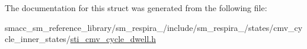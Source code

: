 The documentation for this struct was generated from the following file\+:\begin{DoxyCompactItemize}
\item 
smacc\+\_\+sm\+\_\+reference\+\_\+library/sm\+\_\+respira\+\_/include/sm\+\_\+respira\+\_/states/cmv\+\_\+cycle\+\_\+inner\+\_\+states/\hyperlink{sti__cmv__cycle__dwell_8h}{sti\+\_\+cmv\+\_\+cycle\+\_\+dwell.\+h}\end{DoxyCompactItemize}
